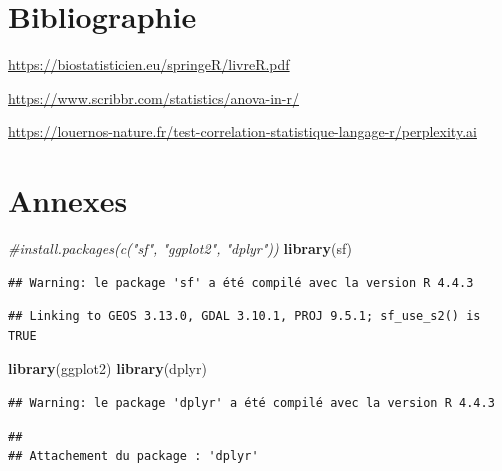 \documentclass[mstat,12pt]{unswthesis}
\newenvironment{Shaded}{\begin{snugshade}}{\end{snugshade}}
\newcommand{\CommentTok}[1]{\textcolor[rgb]{0.56,0.35,0.01}{\textit{#1}}}
\newcommand{\FunctionTok}[1]{\textcolor[rgb]{0.13,0.29,0.53}{\textbf{#1}}}
\newcommand{\NormalTok}[1]{#1}
\begin{document}
\chapter*{Bibliographie}\label{bibliographie}

\label{refs}
\begin{CSLReferences}{0}{1}
\end{CSLReferences}

\url{https://biostatisticien.eu/springeR/livreR.pdf}

\medskip

\url{https://www.scribbr.com/statistics/anova-in-r/}

\medskip

\url{https://louernos-nature.fr/test-correlation-statistique-langage-r/perplexity.ai}

\chapter*{Annexes}\label{annexes}

\begin{Shaded}
\begin{Highlighting}[]
\CommentTok{\#install.packages(c("sf", "ggplot2", "dplyr"))}
\FunctionTok{library}\NormalTok{(sf)}
\end{Highlighting}
\end{Shaded}

\begin{verbatim}
## Warning: le package 'sf' a été compilé avec la version R 4.4.3
\end{verbatim}

\begin{verbatim}
## Linking to GEOS 3.13.0, GDAL 3.10.1, PROJ 9.5.1; sf_use_s2() is TRUE
\end{verbatim}

\begin{Shaded}
\begin{Highlighting}[]
\FunctionTok{library}\NormalTok{(ggplot2)}
\FunctionTok{library}\NormalTok{(dplyr)}
\end{Highlighting}
\end{Shaded}

\begin{verbatim}
## Warning: le package 'dplyr' a été compilé avec la version R 4.4.3
\end{verbatim}

\begin{verbatim}
## 
## Attachement du package : 'dplyr'
\end{verbatim}
\end{document}
